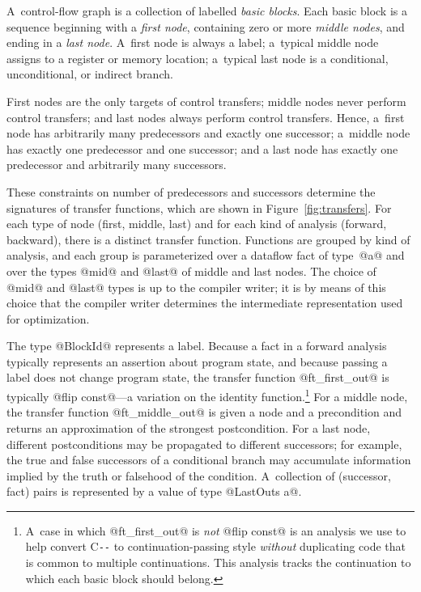 \documentclass[blockstyle,preprint,nocopyrightspace]{sigplanconf}
\newcommand\PAL{\mbox{C{\texttt{-{}-}}}}
\newcommand{\authornote}[1]{{\em #1}}
\def\authornote#1{\unskip\relax}
\newcommand{\norman}[1]{\authornote{NR: #1}}
\let\remark\norman
\newcommand\figref[1]{Figure~\ref{fig:#1}}
\begin{document}
A~control-flow graph is a collection of labelled \emph{basic blocks}.
Each basic block is a sequence beginning with a \emph{first node},
containing zero or more \emph{middle nodes},
and ending in a \emph{last node}.
A~first node is always a label;
a~typical middle node assigns to a register or memory
location;
a~typical last node is a conditional, unconditional, or indirect branch.
\remark{Forward reference?}

First nodes are the only targets of control transfers;
middle nodes never perform control transfers;
and
last nodes always perform control transfers.
Hence, a~first node has arbitrarily many predecessors and exactly one
successor;
a~middle node has exactly one predecessor and one successor;
and a last node has exactly one predecessor and arbitrarily many
successors. 

These constraints on number of predecessors and successors determine
the signatures of 
transfer functions, 
which are shown in \figref{transfers}.
For each type of node (first, middle, last) and for each kind of
analysis (forward, backward), there is a distinct transfer function.
Functions are grouped by kind of analysis, and each group is
parameterized over a dataflow fact of type~@a@ and over the types
@mid@ and @last@ of middle and last nodes.  
The choice of  @mid@ and
@last@ types is up to the compiler writer; it is by means of this
choice that the compiler writer determines the intermediate
representation used for optimization.
\norman{We are having trouble understanding SLPJ's obsession with
distinguishing the ``client'' (an entity we wish not to name) from the
``library'' (another entity we wish not to name} 


The type @BlockId@ represents a label.
Because a fact in a forward analysis typically represents an assertion
about program state,
\remark{Somewhere we need an alert that a fact in a forward analysis
might also represent an assertion about all paths reaching a
 state---maybe a footnote here?}
 and because passing a label does not change
program state, the transfer function @ft_first_out@ is typically 
@flip const@---a variation on
the
identity function.\footnote
{A~case in which @ft\_first\_out@ is \emph{not} @flip const@ is an
 analysis we use to help convert {\PAL} to continuation-passing style
 \emph{without} 
 duplicating code that is common to multiple continuations.
This analysis tracks the continuation to which each basic block should belong.
}
\remark{Somewhere we should explain what a fact in a backward analysis
typically represents}
For a middle node, the transfer function @ft_middle_out@ is given a
node and a precondition and returns an approximation of the strongest
postcondition. 
For a last node, different postconditions may be propagated to
different successors; for example, the true and false successors of a
conditional branch may accumulate information implied by the truth or
falsehood of the condition.
A~collection of (successor, fact) pairs is represented by a value of
type @LastOuts a@.
\end{document}
